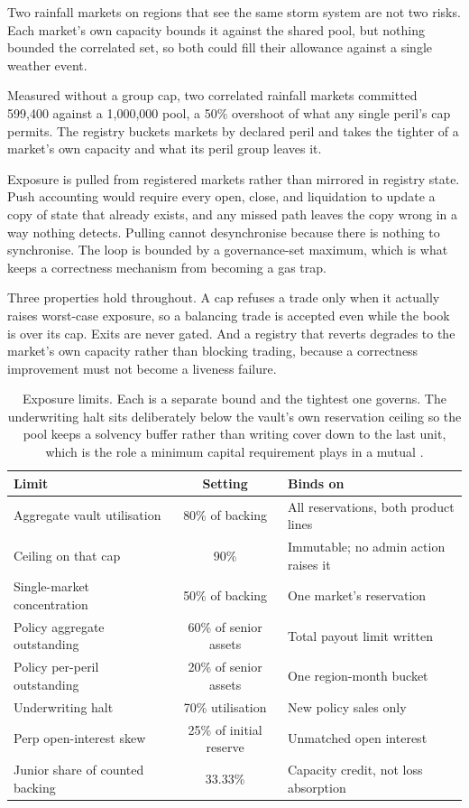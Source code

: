 \documentclass[11pt,a4paper]{article}
\begin{document}
Two rainfall markets on regions that see the same storm system are not two risks. Each
market's own capacity bounds it against the shared pool, but nothing bounded the correlated
set, so both could fill their allowance against a single weather event.

Measured without a group cap, two correlated rainfall markets committed 599{,}400 against a
1{,}000{,}000 pool, a 50\% overshoot of what any single peril's cap permits. The registry
buckets markets by declared peril and takes the tighter of a market's own capacity and what
its peril group leaves it.

Exposure is pulled from registered markets rather than mirrored in registry state. Push
accounting would require every open, close, and liquidation to update a copy of state that
already exists, and any missed path leaves the copy wrong in a way nothing detects. Pulling
cannot desynchronise because there is nothing to synchronise. The loop is bounded by a
governance-set maximum, which is what keeps a correctness mechanism from becoming a gas trap.

Three properties hold throughout. A cap refuses a trade only when it actually raises
worst-case exposure, so a balancing trade is accepted even while the book is over its cap.
Exits are never gated. And a registry that reverts degrades to the market's own capacity
rather than blocking trading, because a correctness improvement must not become a liveness
failure.

\begin{table}[h]
\centering
\small
\setlength{\tabcolsep}{7pt}
\renewcommand{\arraystretch}{1.25}
\begin{tabular}{@{}lcl@{}}
\toprule
\textbf{Limit} & \textbf{Setting} & \textbf{Binds on} \\
\midrule
Aggregate vault utilisation & 80\% of backing & All reservations, both product lines \\
Ceiling on that cap & 90\% & Immutable; no admin action raises it \\
Single-market concentration & 50\% of backing & One market's reservation \\
Policy aggregate outstanding & 60\% of senior assets & Total payout limit written \\
Policy per-peril outstanding & 20\% of senior assets & One region-month bucket \\
Underwriting halt & 70\% utilisation & New policy sales only \\
Perp open-interest skew & 25\% of initial reserve & Unmatched open interest \\
Junior share of counted backing & 33.33\% & Capacity credit, not loss absorption \\
\bottomrule
\end{tabular}
\caption{Exposure limits. Each is a separate bound and the tightest one governs. The
underwriting halt sits deliberately below the vault's own reservation ceiling so the pool
keeps a solvency buffer rather than writing cover down to the last unit, which is the role a
minimum capital requirement plays in a mutual \cite{nexus_mutual}.}
\end{table}
\end{document}

